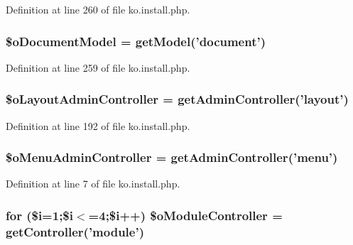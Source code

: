 Definition at line 260 of file ko.\-install.\-php.

\hypertarget{ko_8install_8php_afb18aa87e5520385e76377e876e042af}{
\subsubsection[{\$o\-Document\-Model}]{\setlength{\rightskip}{0pt plus 5cm}\$o\-Document\-Model = {\bf get\-Model}('{\bf document}')}}\label{ko_8install_8php_afb18aa87e5520385e76377e876e042af}


Definition at line 259 of file ko.\-install.\-php.

\hypertarget{ko_8install_8php_a6a03496003da7df71cf94d9accb430be}{
\subsubsection[{\$o\-Layout\-Admin\-Controller}]{\setlength{\rightskip}{0pt plus 5cm}\$o\-Layout\-Admin\-Controller = {\bf get\-Admin\-Controller}('{\bf layout}')}}\label{ko_8install_8php_a6a03496003da7df71cf94d9accb430be}


Definition at line 192 of file ko.\-install.\-php.

\hypertarget{ko_8install_8php_a9062530c3b03479ca4530daee1c18887}{
\subsubsection[{\$o\-Menu\-Admin\-Controller}]{\setlength{\rightskip}{0pt plus 5cm}\$o\-Menu\-Admin\-Controller = {\bf get\-Admin\-Controller}('{\bf menu}')}}\label{ko_8install_8php_a9062530c3b03479ca4530daee1c18887}


Definition at line 7 of file ko.\-install.\-php.

\hypertarget{ko_8install_8php_a9fd93f6625cec4fd65bf6f412e28c015}{
\subsubsection[{\$o\-Module\-Controller}]{\setlength{\rightskip}{0pt plus 5cm}for (\$i=1;\$i$<$=4;\$i++) \$o\-Module\-Controller = {\bf get\-Controller}('{\bf module}')}}\label{ko_8install_8php_a9fd93f6625cec4fd65bf6f412e28c015}


